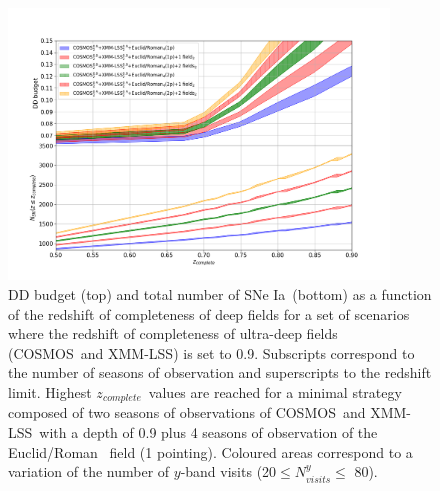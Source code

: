 \documentclass[\docopts]{\docclass}
\newcommand{\cosmos}{{COSMOS}}
\newcommand{\xmm}{{XMM-LSS}}
\newcommand{\adfs}{{Euclid/Roman}}
\newcommand{\sne}{{SNe Ia}}
\newcommand{\zcomp}{\mbox{$z_{complete}$}}
\begin{document}
\begin{figure}[htbp]
\begin{center}
  \includegraphics[width=0.9\textwidth]{budget_zcomp.png}
  \caption{DD budget (top) and total number of \sne~(bottom) as a function of the redshift of completeness of deep fields for a set of scenarios where the redshift of completeness of ultra-deep fields (\cosmos~and \xmm) is set to 0.9. Subscripts correspond to the number of seasons of observation and superscripts to the redshift limit. Highest \zcomp~values are reached for a minimal strategy composed of two seasons of observations of \cosmos~and \xmm~with a depth of 0.9 plus 4 seasons of observation of the \adfs~ field (1 pointing). Coloured areas correspond to a variation of the number of $y$-band visits (20$\leq N_{visits}^y \leq$ 80).}\label{fig:budget_zcomp}
\end{center}
\end{figure}
\end{document}
